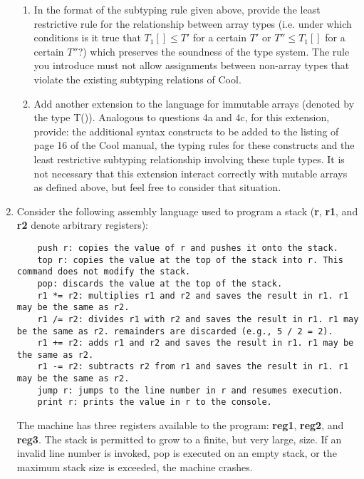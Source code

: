 \documentclass[11pt]{article}
\begin{document}
\begin{enumerate}
\begin{enumerate}
    \item In the format of the subtyping rule given above, provide the least restrictive rule for the relationship between array types (i.e. under which conditions is it true that $T_1[ ] \leq T'$ for a certain $T'$ or $T'' \leq T_1[ ]$ for a certain $T''$?) which preserves the soundness of the type system. The rule you introduce must not allow assignments between non-array types that violate the existing subtyping relations of Cool.
    \item Add another extension to the language for immutable arrays (denoted by the type T()). Analogous to questions 4a and 4c, for this extension, provide: the additional syntax constructs to be added to the listing of page 16 of the Cool manual, the typing rules for these constructs and the least restrictive subtyping relationship involving these tuple types. It is not necessary that this extension interact correctly with mutable arrays as defined above, but feel free to consider that situation. 
  \end{enumerate}
  \newpage
  \item Consider the following assembly language used to program a stack (\textbf{r}, \textbf{r1}, and \textbf{r2} denote arbitrary registers):\\
   \begin{lstlisting}
    push r: copies the value of r and pushes it onto the stack.
    top r: copies the value at the top of the stack into r. This command does not modify the stack.
    pop: discards the value at the top of the stack.
    r1 *= r2: multiplies r1 and r2 and saves the result in r1. r1 may be the same as r2.
    r1 /= r2: divides r1 with r2 and saves the result in r1. r1 may be the same as r2. remainders are discarded (e.g., 5 / 2 = 2).
    r1 += r2: adds r1 and r2 and saves the result in r1. r1 may be the same as r2.
    r1 -= r2: subtracts r2 from r1 and saves the result in r1. r1 may be the same as r2.
    jump r: jumps to the line number in r and resumes execution.
    print r: prints the value in r to the console.
  \end{lstlisting}
  The machine has three registers available to the program: \textbf{reg1}, \textbf{reg2}, and \textbf{reg3}. The stack is permitted to grow to a finite, but very large, size. If an invalid line number is invoked, pop is executed on an empty stack, or the maximum stack size is exceeded, the machine crashes.
  

\end{enumerate}
\end{document}
